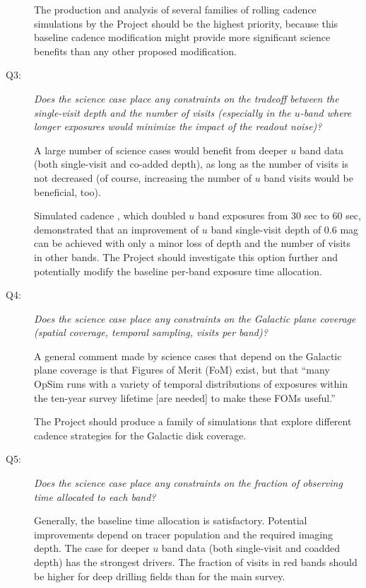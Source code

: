 \begin{description}
The production and analysis of several families of rolling cadence
simulations by the Project should be the highest priority, because this
baseline cadence modification might provide more significant science
benefits than any other proposed modification.


\item[Q3:] {\it Does the science case place any constraints on the
tradeoff between the single-visit depth and the number of visits
(especially in the $u$-band where longer exposures would minimize the
impact of the readout noise)?}


A large number of science cases would benefit from deeper $u$ band data
(both single-visit and co-added depth), as long as the number of visits
is not decreased (of course, increasing the number of $u$ band visits
would be beneficial, too).

Simulated cadence , which
doubled $u$ band exposures from 30 sec to 60 sec, demonstrated that an
improvement of $u$ band single-visit depth of 0.6 mag can be achieved
with only a minor loss of depth and the number of visits in other bands.
The Project should investigate this option further and potentially
modify the baseline per-band exposure time allocation.


\item[Q4:] {\it Does the science case place any constraints on the
Galactic plane coverage (spatial coverage, temporal sampling, visits per
band)?}

A general comment made by science cases that depend on the Galactic
plane coverage is that Figures of Merit (FoM) exist, but that ``many
OpSim runs with a variety of temporal distributions of exposures within
the ten-year survey lifetime [are needed] to make these FOMs useful.''

The Project should produce a family of simulations that explore
different cadence strategies for the Galactic disk coverage.


\item[Q5:] {\it Does the science case place any constraints on the
fraction of observing time allocated to each band?}

Generally, the baseline time allocation is satisfactory. Potential
improvements depend on tracer population and the required imaging depth.
The case for deeper $u$ band data (both single-visit and coadded depth)
has the strongest drivers. The fraction of visits in red bands should be
higher for deep drilling fields than for the main survey.


\end{description}
